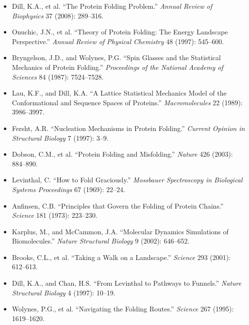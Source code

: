 \documentclass[a4paper, 11pt]{article}
\begin{document}
\begin{itemize}
\item Dill, K.A., et al. ``The Protein Folding Problem.'' \textit{Annual Review of Biophysics}
37 (2008): 289--316.

\item Onuchic, J.N., et al. ``Theory of Protein Folding: The Energy Landscape Perspective.''
\textit{Annual Review of Physical Chemistry} 48 (1997): 545--600.

\item Bryngelson, J.D., and Wolynes, P.G. ``Spin Glasses and the Statistical Mechanics of
Protein Folding.'' \textit{Proceedings of the National Academy of Sciences} 84 (1987): 7524--7528.

\item Lau, K.F., and Dill, K.A. ``A Lattice Statistical Mechanics Model of the Conformational
and Sequence Spaces of Proteins.'' \textit{Macromolecules} 22 (1989): 3986--3997.

\item Fersht, A.R. ``Nucleation Mechanisms in Protein Folding.'' \textit{Current Opinion in
Structural Biology} 7 (1997): 3--9.

\item Dobson, C.M., et al. ``Protein Folding and Misfolding.'' \textit{Nature} 426 (2003):
884--890.

\item Levinthal, C. ``How to Fold Graciously.'' \textit{Mossbauer Spectroscopy in Biological
Systems Proceedings} 67 (1969): 22--24.

\item Anfinsen, C.B. ``Principles that Govern the Folding of Protein Chains.'' \textit{Science}
181 (1973): 223--230.

\item Karplus, M., and McCammon, J.A. ``Molecular Dynamics Simulations of Biomolecules.''
\textit{Nature Structural Biology} 9 (2002): 646--652.

\item Brooks, C.L., et al. ``Taking a Walk on a Landscape.'' \textit{Science} 293 (2001):
612--613.

\item Dill, K.A., and Chan, H.S. ``From Levinthal to Pathways to Funnels.'' \textit{Nature
Structural Biology} 4 (1997): 10--19.

\item Wolynes, P.G., et al. ``Navigating the Folding Routes.'' \textit{Science} 267 (1995):
1619--1620.


\end{itemize}
\end{document}
